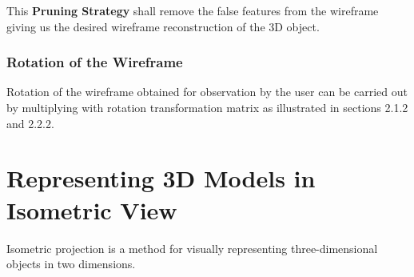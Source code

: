 \documentclass[a4paper,11pt,openany]{book}
\begin{document}
This \textbf{Pruning Strategy} shall remove the false features from the wireframe giving us the desired wireframe reconstruction of the 3D object. 

\subsection{Rotation of the Wireframe}
Rotation of the wireframe obtained for observation by the user can be carried out by multiplying with rotation transformation matrix as illustrated in sections 2.1.2 and 2.2.2.



\chapter{Representing 3D Models in Isometric View }
Isometric projection is a method for visually representing three-dimensional objects in two dimensions.
\end{document}
